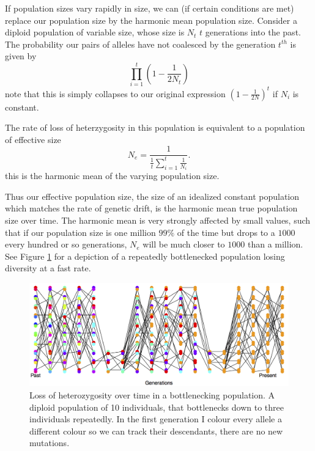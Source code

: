 If population sizes vary rapidly in size, we can (if certain conditions are met)
replace our population size by the harmonic mean population size.
Consider a diploid population of variable size, whose size is $N_t$ $t$ generations into the
past. The probability our pairs of alleles have not coalesced by the generation $t^{th}$ is
given by
\begin{equation}
\prod_{i=1}^{t} \left(1-\frac{1}{2N_t} \right) \label{eqn:var_pop_coal}
\end{equation}
note that this is simply collapses to our original expression
$\left(1-\frac{1}{2N } \right)^t $ if $N_i$ is constant. 

The rate of loss of heterzygosity in this population is equivalent to
a population of effective size
\begin{equation}
N_e =\frac{1}{\frac{1}{t} \sum_{i=1}^{t} \frac{1}{N_i} }. \label{eq:Ne_harmonic}
\end{equation}
this is the harmonic mean of the varying population size.



Thus our
effective population size, the size of an idealized constant
population which matches the rate of genetic drift, is the harmonic
mean true population size over time. The harmonic mean is very
strongly affected by small values, such that if our population size is
one million $99\%$ of the time but drops to a $1000$ every hundred or
so generations, $N_e$ will be much closer to $1000$ than a
million. See Figure \ref{fig:LossHet_varying_pop}  for a depiction of
a repeatedly bottlenecked population losing diversity at a fast rate.\\

\begin{figure}
\begin{center}
\includegraphics[width= \textwidth]{figures/Loss_of_he_col_alleles_varying_pop_dark.png}
\end{center}
\caption{Loss of heterozygosity over time in a bottlenecking population. A diploid population of 10 individuals, that bottlenecks
  down to three individuals repeatedly. In the first generation I colour every allele a different
colour so we can track their descendants, there are no new
  mutations.} \label{fig:LossHet_varying_pop}  
\end{figure} 

